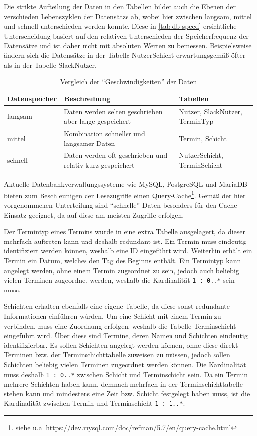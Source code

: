 Die strikte Aufteilung der Daten in den Tabellen bildet auch die Ebenen der verschieden Lebenszyklen der Datensätze ab, wobei hier zwischen langsam, mittel und schnell unterschieden werden konnte. Diese in \autoref{tab:db-speed} ersichtliche Unterscheidung basiert auf den relativen Unterschieden der Speicherfrequenz der Datensätze und ist daher nicht mit absoluten Werten zu bemessen. Beispielsweise ändern sich die Datensätze in der Tabelle NutzerSchicht erwartungsgemäß öfter als in der Tabelle SlackNutzer.

\begin{table}[H]
    \begin{tabularx}{0.9\columnwidth}{|l|X|X|}
    \hline
    \textbf{Datenspeicher} & \textbf{Beschreibung} & \textbf{Tabellen} \\
    \hline
    langsam & Daten werden selten geschrieben aber lange gespeichert & Nutzer, SlackNutzer, TerminTyp \\
    \hline
    mittel & Kombination schneller und langsamer Daten & Termin, Schicht \\
    \hline
    schnell & Daten werden oft geschrieben und relativ kurz gespeichert & NutzerSchicht, TerminSchicht \\
    \hline
    \end{tabularx}
    \caption{Vergleich der \enquote{Geschwindigkeiten} der Daten}
    \label{tab:db-speed}
\end{table}

Aktuelle Datenbankverwaltungssysteme wie MySQL, PostgreSQL und MariaDB bieten zum Beschleunigen der Lesezugriffe einen Query-Cache\footnote{siehe u.a. \url{https://dev.mysql.com/doc/refman/5.7/en/query-cache.html}}. Gemäß der hier vorgenommenen Unterteilung sind \enquote{schnelle} Daten besonders für den Cache-Einsatz geeignet, da auf diese am meisten Zugriffe erfolgen. 

Der Termintyp eines Termins wurde in eine extra Tabelle ausgelagert, da dieser mehrfach auftreten kann und deshalb redundant ist. Ein Termin muss eindeutig identifiziert werden können, weshalb eine ID eingeführt wird. Weiterhin erhält ein Termin ein Datum, welches den Tag des Beginns enthält. Ein Termintyp kann angelegt werden, ohne einem Termin zugeordnet zu sein, jedoch auch beliebig vielen Terminen zugeordnet werden, weshalb die Kardinalität \texttt{1 : 0..*} sein muss.

Schichten erhalten ebenfalls eine eigene Tabelle, da diese sonst redundante Informationen einführen würden. Um eine Schicht mit einem Termin zu verbinden, muss eine Zuordnung erfolgen, weshalb die Tabelle Terminschicht eingeführt wird. Über diese sind Termine, deren Namen und Schichten eindeutig identifizierbar. Es sollen Schichten angelegt werden können, ohne diese direkt Terminen bzw. der Terminschichttabelle zuweisen zu müssen, jedoch sollen Schichten beliebig vielen Terminen zugeordnet werden können. Die Kardinalität muss deshalb \texttt{1 : 0..*} zwischen Schicht und Terminschicht sein. Da ein Termin mehrere Schichten haben kann, demnach mehrfach in der Terminschichttabelle stehen kann und mindestens eine Zeit bzw. Schicht festgelegt haben muss, ist die Kardinalität zwischen Termin und Terminschicht \texttt{1 : 1..*}.

